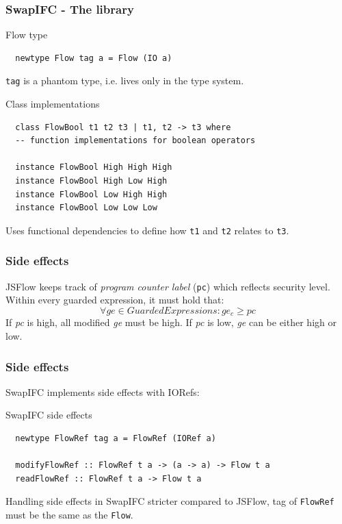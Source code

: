 \documentclass{beamer}
\begin{document}
\begin{frame}[fragile]
  \frametitle{SwapIFC - The library}
  \begin{block}{Flow type}
\begin{verbatim}
  newtype Flow tag a = Flow (IO a)
\end{verbatim}
  \end{block}
  {\tt tag} is a phantom type, i.e. lives only in the type system. \pause
  \begin{block}{Class implementations}
\begin{verbatim}
  class FlowBool t1 t2 t3 | t1, t2 -> t3 where
  -- function implementations for boolean operators

  instance FlowBool High High High
  instance FlowBool High Low High
  instance FlowBool Low High High
  instance FlowBool Low Low Low
\end{verbatim}
  \end{block}
  Uses functional dependencies to define how {\tt t1} and {\tt t2} relates to {\tt t3}.
\end{frame}


\begin{frame}
  \frametitle{Side effects}
  JSFlow keeps track of \emph{program counter label} ({\tt pc}) which reflects security level. \pause
  \newline
  Within every guarded expression, it must hold that:\[ \forall ge \in GuardedExpressions: ge_c \geq pc \] \pause
  If \emph{pc} is high, all modified \emph{ge} must be high. If \emph{pc} is low, \emph{ge} can be either high or low.
\end{frame}


\begin{frame}[fragile]
  \frametitle{Side effects}
  SwapIFC implements side effects with IORefs:
  \begin{block}{SwapIFC side effects}
\begin{verbatim}
  newtype FlowRef tag a = FlowRef (IORef a)

  modifyFlowRef :: FlowRef t a -> (a -> a) -> Flow t a
  readFlowRef :: FlowRef t a -> Flow t a
\end{verbatim}
  \end{block}
  \pause
  Handling side effects in SwapIFC stricter compared to JSFlow, tag of {\tt FlowRef} must be the same as the {\tt Flow}.
\end{frame}
\end{document}
